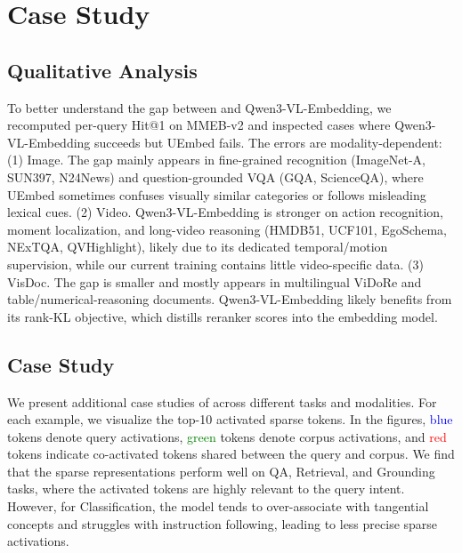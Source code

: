 \section{Case Study}\label{sec:appendix-case-study}

\subsection{Qualitative Analysis}
To better understand the gap between \ours and Qwen3-VL-Embedding, we recomputed per-query Hit@1 on MMEB-v2 and inspected cases where Qwen3-VL-Embedding succeeds but UEmbed fails. The errors are modality-dependent: 
(1) Image. The gap mainly appears in fine-grained recognition (ImageNet-A, SUN397, N24News) and question-grounded VQA (GQA, ScienceQA), where UEmbed sometimes confuses visually similar categories or follows misleading lexical cues.
(2) Video. Qwen3-VL-Embedding is stronger on action recognition, moment localization, and long-video reasoning (HMDB51, UCF101, EgoSchema, NExTQA, QVHighlight), likely due to its dedicated temporal/motion supervision, while our current training contains little video-specific data.
(3) VisDoc. The gap is smaller and mostly appears in multilingual ViDoRe and table/numerical-reasoning documents. Qwen3-VL-Embedding likely benefits from its rank-KL objective, which distills reranker scores into the embedding model.

\subsection{Case Study}
We present additional case studies of \ours across different tasks and modalities. For each example, we visualize the top-10 activated sparse tokens. In the figures, \textcolor{blue}{blue} tokens denote query activations, \textcolor{green}{green} tokens denote corpus activations, and \textcolor{red}{red} tokens indicate co-activated tokens shared between the query and corpus.
We find that the sparse representations perform well on QA, Retrieval, and Grounding tasks, where the activated tokens are highly relevant to the query intent. However, for Classification, the model tends to over-associate with tangential concepts and struggles with instruction following, leading to less precise sparse activations. 









